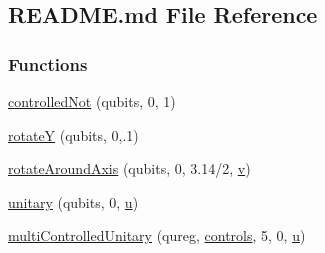 \hypertarget{README_8md}{
\subsection{README.md File Reference}
\label{README_8md}
}
\subsubsection*{Functions}
\begin{DoxyCompactItemize}
\item 
\hyperlink{README_8md_a919bff7d5f7b67fde28e771903fff6f1}{controlledNot} (qubits, 0, 1)
\item 
\hyperlink{README_8md_a6f495fc15ce3f43b4c8adbf43cb881ea}{rotateY} (qubits, 0,.1)
\item 
\hyperlink{README_8md_ac4cb8c0825f6c6a74b839bbd4ae22ea4}{rotateAroundAxis} (qubits, 0, 3.14/2, \hyperlink{README_8md_a22eb3b09da74633038e36bd8dfef55c0}{v})
\item 
\hyperlink{README_8md_a22b5a2d7f987c5e030a1d683d9483f49}{unitary} (qubits, 0, \hyperlink{README_8md_a5d1c311241dc8d8ffa4badf059977dc5}{u})
\item 
\hyperlink{README_8md_a25572bc3f038713ed311fea2b40de0e9}{multiControlledUnitary} (qureg, \hyperlink{README_8md_a636f16bb55903420974dfd184205e591}{controls}, 5, 0, \hyperlink{README_8md_a5d1c311241dc8d8ffa4badf059977dc5}{u})
\end{DoxyCompactItemize}
